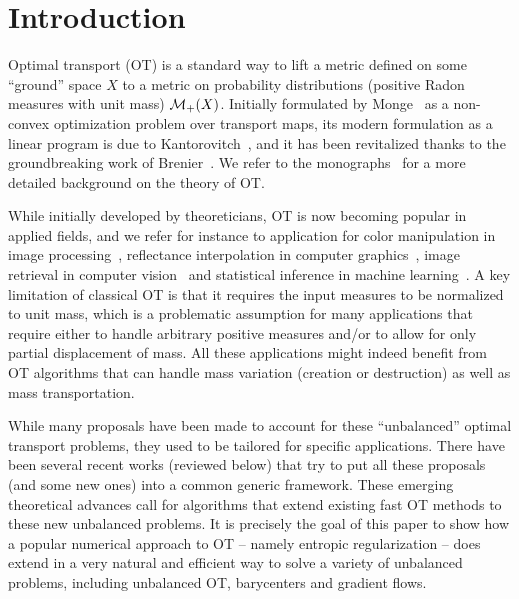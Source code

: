 
\section{Introduction}


Optimal transport (OT) is a standard way to lift a metric defined on some ``ground'' space $X$ to a metric on probability distributions (positive Radon measures with unit mass) $\mathcal{M}_+(X)$. Initially formulated by Monge~\cite{Monge1781} as a non-convex optimization problem over transport maps, its modern formulation as a linear program is due to Kantorovitch~\cite{Kantorovich42}, and it has been revitalized thanks to the groundbreaking work of Brenier~\cite{Brenier91}. We refer to the monographs~\cite{cedric2003topics,SantambrogioBook} for a more detailed background on the theory of OT. 

While initially developed by theoreticians, OT is now becoming popular in applied fields, and we refer for instance to application for color manipulation in image processing~\cite{RabinPapadakisSSVM}, reflectance interpolation in computer graphics~\cite{Bonneel-displacement}, image retrieval in computer vision~\cite{RubTomGui00} and statistical inference in machine learning~\cite{Solomon-ICML}. A key limitation of classical OT is that it requires the input measures to be normalized to unit mass, which is a problematic assumption for many applications that require either to handle arbitrary positive measures and/or to allow for only partial displacement of mass. All these applications might indeed benefit from OT algorithms that can handle mass variation (creation or destruction) as well as mass transportation.

While many proposals have been made to account for these ``unbalanced'' optimal transport problems, they used to be tailored for specific applications. There have been several recent works (reviewed below) that try to put all these proposals (and some new ones) into a common generic framework. These emerging theoretical advances call for algorithms that extend existing fast OT methods to these new unbalanced problems. It is precisely the goal of this paper to show how a popular numerical approach to OT -- namely entropic regularization -- does extend in a very natural and efficient way to solve a variety of unbalanced problems, including unbalanced OT, barycenters and gradient flows. 



